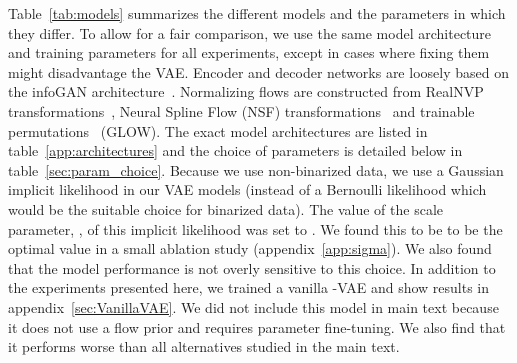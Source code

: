 \documentclass[10pt]{article} \usepackage[accepted]{tmlr}
\newcommand{\rev}[1]{{\color{black}#1}}
\begin{document}
Table~\ref{tab:models} summarizes the different models and the parameters in which they differ. To allow for a fair comparison, we use the same model architecture and training parameters for all experiments, except in cases where fixing them might disadvantage the VAE. Encoder and decoder networks are loosely based on the infoGAN architecture~\citep{infoGAN}. Normalizing flows are constructed from RealNVP transformations~\citep{DinhSB16}, Neural Spline Flow (NSF) transformations~\citep{durkan2019neural} and trainable permutations~\citep{glow} (GLOW). The exact model architectures are listed in table~\ref{app:architectures} and the choice of parameters is detailed below in table~\ref{sec:param_choice}. Because we use non-binarized data, we use a Gaussian implicit likelihood in our VAE models (instead of a Bernoulli likelihood which would be the suitable choice for binarized data). The value of the scale parameter, , of this implicit likelihood was set to . We found this to be to be the optimal value in a small ablation study (appendix~\ref{app:sigma}). We also found that the model performance is not overly sensitive to this choice. \rev{In addition to the experiments presented here, we trained a vanilla -VAE and show results in appendix~\ref{sec:VanillaVAE}. We did not include this model in main text because it does not use a flow prior and requires parameter fine-tuning. We also find that it performs worse than all alternatives studied in the main text.}
\end{document}
